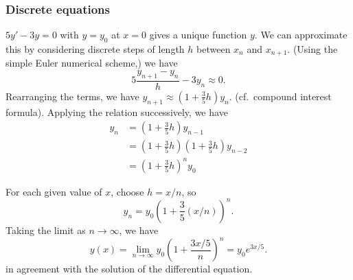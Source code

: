\documentclass[a4paper]{article}
\begin{document}
  \subsubsection{Discrete equations}
  $5y' - 3y = 0$ with $y = y_0$ at $x = 0$ gives a unique function $y$. We can approximate this by considering discrete steps of length $h$ between $x_n$ and $x_{n+1}$. (Using the simple Euler numerical scheme,) we have
  \[
    5\frac{y_{n+1} - y_n}{h} - 3y_n \approx 0.
  \]
  Rearranging the terms, we have $y_{n+1} \approx (1 + \frac{3}{5}h)y_n$. (cf.\ compound interest formula). Applying the relation successively, we have 
  \begin{align*}
    y_n &= \left(1 + \frac{3}{5}h\right)y_{n - 1}\\
    &= \left(1 + \frac{3}{5}h\right)\left(1 + \frac{3}{5}h\right)y_{n - 2}\\
    &= \left(1 + \frac{3}{5}h\right)^ny_0
  \end{align*}

  For each given value of $x$, choose $h = x/n$, so
  \[
    y_n = y_0\left(1 + \frac{3}{5}(x/n)\right)^n.
  \]
  Taking the limit as $n\to \infty$, we have
  \[
    y(x) = \lim_{n\to \infty} y_0\left(1 + \frac{3x/5}{n}\right)^n = y_0 e^{3x/5}.
  \]
  in agreement with the solution of the differential equation.

  \begin{center}
  \end{center}
\end{document}
